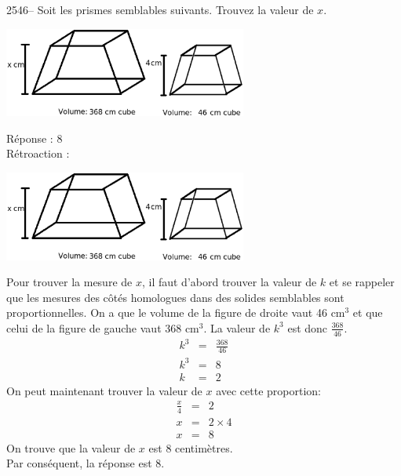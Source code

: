 \documentclass[letterpaper, 12pt]{article}
\begin{document}
2546-- Soit les prismes semblables suivants. Trouvez la valeur de $x$.\\
\begin{center}
 \includegraphics[width=8cm,bb=0 532 724 842]{Q2546.eps}
\end{center}

R\'eponse : 8\\

R\'etroaction :\\
\begin{center}
 \includegraphics[width=8cm,bb=0 532 724 842]{Q2546.eps}
\end{center}
Pour trouver la mesure de $x$, il faut d'abord trouver la valeur de $k$ et se rappeler que les mesures des c\^ot\'es homologues dans des solides semblables sont proportionnelles. On a que le volume de la figure de droite vaut 46 cm$^{3}$ et que celui de la figure de gauche vaut 368 cm$^{3}$. La valeur de $k^{3}$ est donc $\frac{368}{46}$.\\
\begin{eqnarray*}
k^{3}&=&\frac{368}{46}\\[2mm]
k^{3}&=&8\\[2mm]
k&=&2
\end{eqnarray*}
On peut maintenant trouver la valeur de $x$ avec cette proportion:
\begin{eqnarray*}
 \frac{x}{4}&=&2\\[2mm]
x&=&2\times 4\\[2mm]
x&=&8
\end{eqnarray*}
On trouve que la valeur de $x$ est 8 centim\`etres.\\
Par cons\'equent, la r\'eponse est 8.\\
\end{document}
